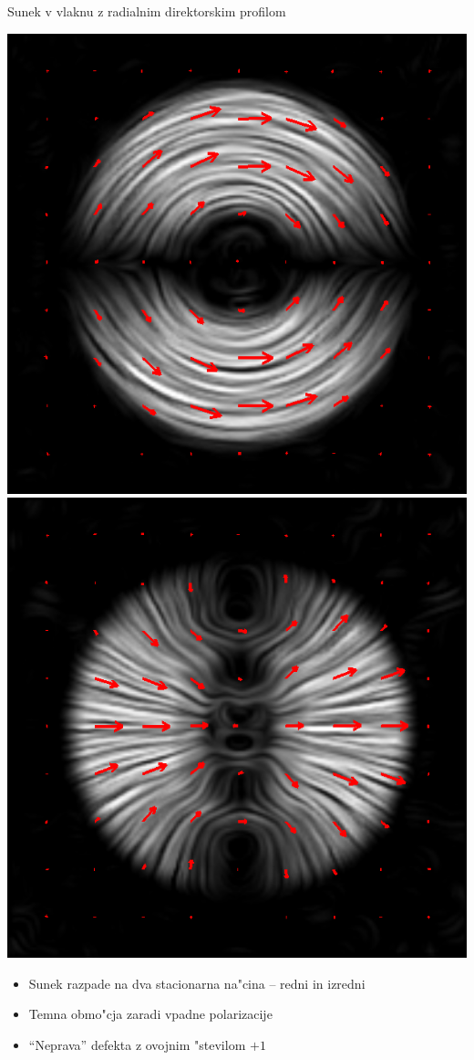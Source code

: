 \documentclass{beamer}
\begin{document}
\begin{frame}{Sunek v vlaknu z radialnim direktorskim profilom}

 \begin{center}
 \includegraphics[width=.4\textwidth]{./Slike/licp_p1_74}\quad
  \includegraphics[width=.4\textwidth]{./Slike/licp_p1_82}
\end{center}

\begin{itemize}
 \item Sunek razpade na dva stacionarna na"cina -- redni in izredni
 \item Temna obmo"cja zaradi vpadne polarizacije
 \item ``Neprava'' defekta z ovojnim "stevilom $+1$
\end{itemize}

\end{frame}
\end{document}
